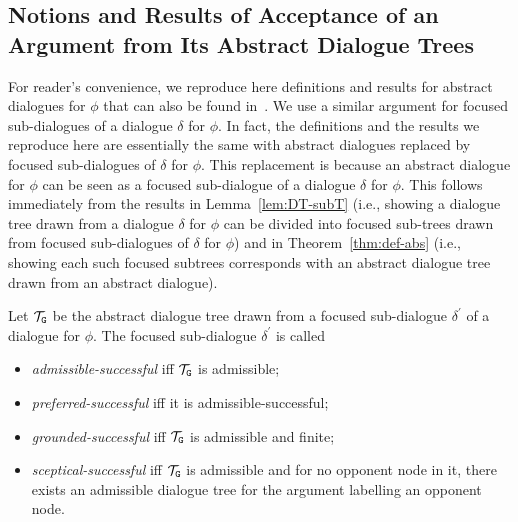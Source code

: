 \subsection{Notions and Results of Acceptance of an Argument from Its Abstract Dialogue Trees}

For reader's convenience, we reproduce here definitions and results for abstract dialogues for $\phi$ that can also be found in~\cite{loanho_2024}. 
We use a similar argument for focused sub-dialogues of a dialogue $\delta$ for $\phi$. 
In fact, the definitions and the results we reproduce here are essentially the same with abstract dialogues replaced by focused sub-dialogues of $\delta$ for $\phi$. This replacement is because an abstract dialogue for $\phi$ can be seen as a focused sub-dialogue of a dialogue $\delta$ for $\phi$. This follows immediately from the results in Lemma~\ref{lem:DT-subT} 
(i.e., showing a dialogue tree drawn from a dialogue $\delta$ for $\phi$ can be divided into focused sub-trees drawn from focused sub-dialogues of $\delta$ for $\phi$)
and in Theorem~\ref{thm:def-abs} 
(i.e., showing each such focused subtrees corresponds with an abstract dialogue tree drawn from an abstract dialogue).

\begin{definition} 
\label{def:analogous-Def9}
Let $\mathcal{T}_{\texttt{\textup{G}}}$ be the abstract dialogue tree drawn from a focused sub-dialogue $\delta^ \prime$ of a dialogue for $\phi$. The focused sub-dialogue $\delta^ \prime$ is called
    \begin{itemize}
        \item \emph{admissible-successful} iff $\mathcal{T}_{\texttt{\textup{G}}}$ is admissible;

        \item \emph{preferred-successful} iff it is admissible-successful;
        
        \item  \emph{grounded-successful} iff $\mathcal{T}_{\texttt{\textup{G}}}$ is admissible and finite;

        \item  \emph{sceptical-successful} iff $\mathcal{T}_{\texttt{\textup{G}}}$ is admissible and for no opponent node in it, there exists an admissible dialogue tree for the argument labelling an opponent node.     
    \end{itemize} 
\end{definition}


